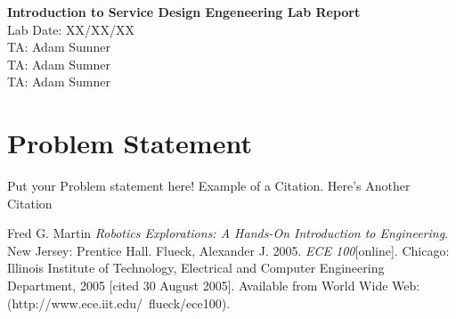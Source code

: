 \documentclass[letterpaper,12pt]{article}
\begin{document}
\noindent
\large\textbf{Introduction to Service Design Engeneering Lab Report}\\

\hfill Lab Date: XX/XX/XX \\
TA: Adam Sumner \\
TA: Adam Sumner \\
TA: Adam Sumner \\

\section*{Problem Statement}
Put your Problem statement here! Example of a Citation\cite[p.219]{Robotics}. Here's Another Citation\cite{Flueck}

\begin{thebibliography}{9}
 Fred G. Martin \emph{Robotics Explorations: A Hands-On Introduction to Engineering}. New Jersey: Prentice Hall.
  Flueck, Alexander J. 2005. \emph{ECE 100}[online]. Chicago: Illinois Institute of Technology, Electrical and Computer Engineering Department, 2005 [cited 30
August 2005]. Available from World Wide Web: (http://www.ece.iit.edu/~flueck/ece100).
\end{thebibliography}
\end{document}
